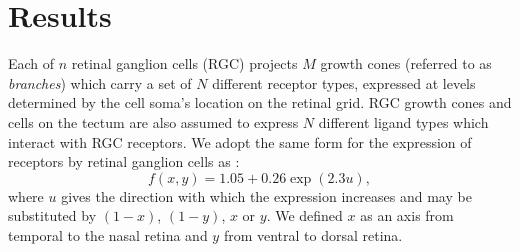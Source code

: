 \documentclass[9pt]{elife} %
\begin{document}

\section{Results}


Each of $n$ retinal ganglion cells (RGC) projects $M$ growth cones (referred to as \emph{branches}) which carry a set of $N$ different receptor types, expressed at levels determined by the cell soma's location on the retinal grid. RGC growth cones and cells on the tectum are also assumed to express $N$ different ligand types which interact with RGC receptors.
%
We adopt the same form for the expression of receptors by retinal ganglion cells as
\citet{simpson_simple_2011}:
\begin{equation} \label{e:f}
  f(x,y) = 1.05 + 0.26 \exp(2.3 u),
\end{equation}
where $u$ gives the direction with which the expression increases and may be substituted by $(1-x)$, $(1-y)$, $x$ or $y$. We defined $x$ as an axis from temporal to the nasal retina and $y$ from ventral to dorsal retina.
\end{document}
